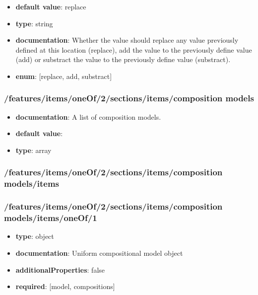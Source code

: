 \begin{itemize}\item {\bf default value}: replace
\item {\bf type}: string
\item {\bf documentation}: Whether the value should replace any value previously defined at this location (replace), add the value to the previously define value (add) or substract the value to the previously define value (substract).
\item {\bf enum}: [replace, add, substract]\end{itemize}\subsubsection{/features/items/oneOf/2/sections/items/composition models}
\begin{itemize}\item {\bf documentation}: A list of composition models.
\item {\bf default value}: 
\item {\bf type}: array
\end{itemize}\subsubsection{/features/items/oneOf/2/sections/items/composition models/items}

\subsubsection{/features/items/oneOf/2/sections/items/composition models/items/oneOf/1}
\begin{itemize}\item {\bf type}: object
\item {\bf documentation}: Uniform compositional model object
\item {\bf additionalProperties}: false
\item {\bf required}: [model, compositions]\end{itemize}
